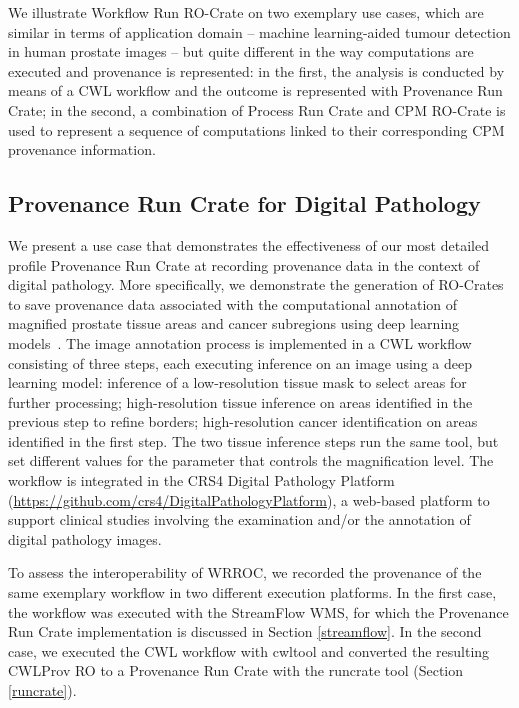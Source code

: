 \documentclass[10pt,letterpaper]{article}
\begin{document}
We illustrate Workflow Run RO-Crate on two exemplary use cases, which are similar in terms of application domain -- machine learning-aided tumour detection in human prostate images -- but quite different in the way computations are executed and provenance is represented: in the first, the analysis is conducted by means of a CWL workflow and the outcome is represented with Provenance Run Crate; in the second, a combination of Process Run Crate and CPM RO-Crate is used to represent a sequence of computations linked to their corresponding CPM provenance information.


\subsection{Provenance Run Crate for Digital Pathology}\label{provenance-run-crate-for-digital-pathology}

We present a use case that demonstrates the effectiveness of our most detailed profile Provenance Run Crate at recording provenance data in the context of digital pathology.
More specifically, we demonstrate the generation of RO-Crates to save provenance data associated with the computational annotation of magnified prostate tissue areas and cancer subregions using deep learning models~\cite{Del Rio 2022}.
The image annotation process is implemented in a CWL workflow consisting of three steps, each executing inference on an image using a deep learning model: inference of a low-resolution tissue mask to select areas for further processing;
high-resolution tissue inference on areas identified in the previous step to refine borders; high-resolution cancer identification on areas identified in the first step.
The two tissue inference steps run the same tool, but set different values for the parameter that controls the magnification level.
The workflow is integrated in the CRS4 Digital Pathology Platform (\url{https://github.com/crs4/DigitalPathologyPlatform}), a web-based platform to support clinical studies involving the examination and/or the annotation of digital pathology images.

To assess the interoperability of WRROC, we recorded the provenance of the same exemplary workflow in two different execution platforms.
In the first case, the workflow was executed with the StreamFlow WMS, for which the Provenance Run Crate implementation is discussed in Section \ref{streamflow}.
In the second case, we executed the CWL workflow with cwltool and converted the resulting CWLProv RO to a Provenance Run Crate with the runcrate tool (Section \ref{runcrate}).
\end{document}
